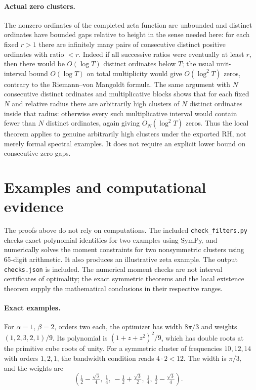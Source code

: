 \documentclass[11pt]{article}
\theoremstyle{remark}\newtheorem{remark}[theorem]{Remark}
\begin{document}
\paragraph{Actual zero clusters.} The nonzero ordinates of the completed zeta function are unbounded and distinct ordinates have bounded gaps relative to height in the sense needed here: for each fixed $r>1$ there are infinitely many pairs of consecutive distinct positive ordinates with ratio $<r$. Indeed if all successive ratios were eventually at least $r$, then there would be $O(\log T)$ distinct ordinates below $T$; the usual unit-interval bound $O(\log T)$ on total multiplicity would give $O(\log^2 T)$ zeros, contrary to the Riemann--von Mangoldt formula. The same argument with $N$ consecutive distinct ordinates and multiplicative blocks shows that for each fixed $N$ and relative radius there are arbitrarily high clusters of $N$ distinct ordinates inside that radius: otherwise every such multiplicative interval would contain fewer than $N$ distinct ordinates, again giving $O_N(\log^2 T)$ zeros. Thus the local theorem applies to genuine arbitrarily high clusters under the exported RH, not merely formal spectral examples. It does not require an explicit lower bound on consecutive zero gaps.

\section{Examples and computational evidence}
The proofs above do not rely on computations. The included \texttt{check\_filters.py} checks exact polynomial identities for two examples using SymPy, and numerically solves the moment constraints for two nonsymmetric clusters using 65-digit arithmetic. It also produces an illustrative zeta example. The output \texttt{checks.json} is included. The numerical moment checks are not interval certificates of optimality; the exact symmetric theorems and the local existence theorem supply the mathematical conclusions in their respective ranges.

\paragraph{Exact examples.} For $\alpha=1$, $\beta=2$, orders two each, the optimizer has width $8\pi/3$ and weights $(1,2,3,2,1)/9$. Its polynomial is $(1+z+z^2)^2/9$, which has double roots at the primitive cube roots of unity. For a symmetric cluster of frequencies $10,12,14$ with orders $1,2,1$, the bandwidth condition reads $4\cdot2<12$. The width is $\pi/3$, and the weights are
\[
 \left(\tfrac12-\tfrac{\sqrt3}4,\ \tfrac14,\ -\tfrac12+\tfrac{\sqrt3}2,\ \tfrac14,\ \tfrac12-\tfrac{\sqrt3}4\right).
\]
\end{document}
